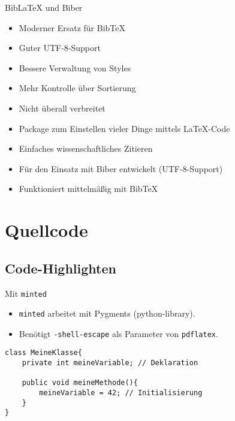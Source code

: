 \documentclass{beamer}
\begin{document}
		\begin{frame}{Bib\LaTeX{} und Biber}

			\begin{itemize}
				\item Moderner Ersatz für Bib\TeX{}
				\item Guter UTF-8-Support
				\item Bessere Verwaltung von Styles
				\item Mehr Kontrolle über Sortierung
				\item Nicht überall verbreitet
			\end{itemize}
			\begin{itemize}
				\item Package zum Einstellen vieler Dinge mittels \LaTeX{}-Code
				\item Einfaches wissenschaftliches Zitieren
				\item Für den Einsatz mit Biber entwickelt (UTF-8-Support)
				\item Funktioniert mittelmäßig mit Bib\TeX{}
			\end{itemize}


		\end{frame}


		\section{Quellcode}
		\subsection{Code-Highlighten}


		\begin{frame}[containsverbatim]{Mit \texttt{minted}}
			\begin{itemize}
				\item \texttt{minted} arbeitet mit Pygments (python-library).
				\item Benötigt \texttt{-shell-escape} als Parameter von \texttt{pdflatex}.
			\end{itemize}

			\begin{smalllatexcode}
\usepackage{minted}
\begin{verbatim}
class MeineKlasse{
	private int meineVariable; // Deklaration

	public void meineMethode(){
		meineVariable = 42; // Initialisierung
	}
}
\end{verbatim}
			\end{smalllatexcode}
		\end{frame}
\end{document}
